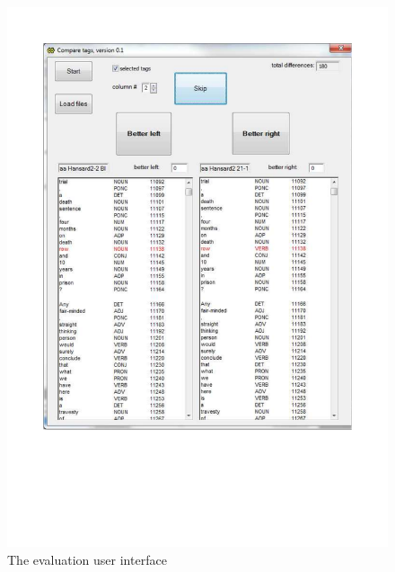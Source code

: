 \documentclass[output=paper]{langsci/langscibook}
\begin{document}
\begin{figure}[p]
  \includegraphics[width=\textwidth, clip, trim=20mm 60mm 20mm 20mm]{figures/fips-screenshot.pdf}
\caption{\label{fou:figScreen}The evaluation user interface}
\end{figure}
\end{document}
